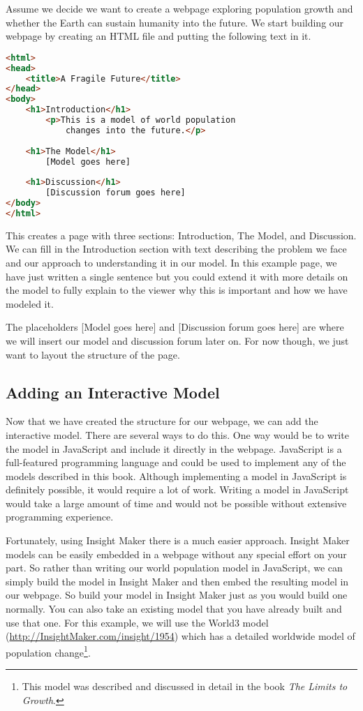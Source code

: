 \documentclass[]{memoir}
\begin{document}
Assume we decide we want to create a webpage exploring population growth
and whether the Earth can sustain humanity into the future. We start
building our webpage by creating an HTML file and putting the following
text in it.

\begin{lstlisting}[language=HTML]
<html>
<head>
    <title>A Fragile Future</title>
</head>
<body>
    <h1>Introduction</h1>
        <p>This is a model of world population
            changes into the future.</p>
            
    <h1>The Model</h1>
        [Model goes here]
        
    <h1>Discussion</h1>
        [Discussion forum goes here]
</body>
</html>
\end{lstlisting}

This creates a page with three sections: Introduction, The Model, and
Discussion. We can fill in the Introduction section with text describing
the problem we face and our approach to understanding it in our model.
In this example page, we have just written a single sentence but you
could extend it with more details on the model to fully explain to the
viewer why this is important and how we have modeled it.

The placeholders {[}Model goes here{]} and {[}Discussion forum goes
here{]} are where we will insert our model and discussion forum later
on. For now though, we just want to layout the structure of the page.

\subsection{Adding an Interactive Model}

Now that we have created the structure for our webpage, we can add the
interactive model. There are several ways to do this. One way would be
to write the model in JavaScript and include it directly in the webpage.
JavaScript is a full-featured programming language and could be used to
implement any of the models described in this book. Although
implementing a model in JavaScript is definitely possible, it would
require a lot of work. Writing a model in JavaScript would take a large
amount of time and would not be possible without extensive programming
experience.

Fortunately, using Insight Maker there is a much easier approach.
Insight Maker models can be easily embedded in a webpage without any
special effort on your part. So rather than writing our world population
model in JavaScript, we can simply build the model in Insight Maker and
then embed the resulting model in our webpage. So build your model in
Insight Maker just as you would build one normally. You can also take an
existing model that you have already built and use that one. For this
example, we will use the World3 model
(\url{http://InsightMaker.com/insight/1954}) which has a detailed
worldwide model of population change\footnote{This model was described
  and discussed in detail in the book \emph{The Limits to Growth}.}.
\end{document}
